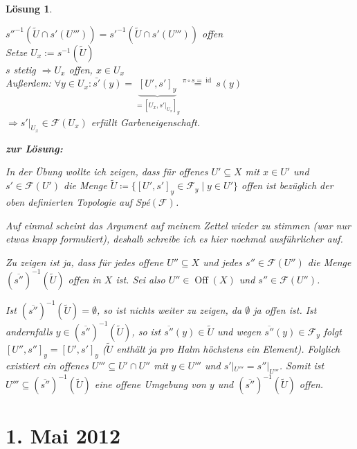 \documentclass[a4paper,12pt]{report}
\theoremstyle{break}
\newtheorem{Loes}{L\"osung}
\theoremstyle{nonumberbreak}
\theoremstyle{nonumberplain}
\newcommand{\quot}[1]{\textrm{\glqq}{#1}\textrm{\grqq}}
\newenvironment{twosidedproof}{\begin{enumerate}[\quot{$\Rightarrow$}:]}{\end{enumerate}}
\DeclareMathOperator{\Off}{Off}
\DeclareMathOperator{\id}{id}
\newcommand{\calF}{\mathcal{F}}
\begin{document}
\begin{Loes}
\begin{twosidedproof}
	$s''^{-1}(\widetilde U \cap s'(U''')) = s'^{-1}(\widetilde U \cap s'(U'''))$ offen\\
	Setze $U_x:= s^{-1}(\widetilde U)$\\
	$s$ stetig $\Rightarrow U_x$ offen, $x\in U_x$\\
	Au\ss erdem: $\forall y \in U_x: \bar{s'}(y) = \underbrace{[U', s']_y}_{=[U_x, s'|_{U_x}]_y} \overset{\pi \circ s = \id}{=} s(y)$\\
	$\Rightarrow s'|_{U_x} \in \calF(U_x)$ erf\"ullt Garbeneigenschaft.
\end{twosidedproof}

\textbf{zur Lösung:}

In der Übung wollte ich zeigen, dass für offenes $U' \subseteq X$ mit $x \in U'$ und $s' \in \mathcal{F}(U')$ die Menge $\tilde{U} \coloneqq \{ [U',s']_y \in \mathcal{F}_y \mid y \in U' \}$ offen ist bezüglich der oben definierten Topologie auf Sp\'e$(\mathcal{F})$.

Auf einmal scheint das Argument auf meinem Zettel wieder zu stimmen (war nur etwas knapp formuliert), deshalb schreibe ich es hier nochmal ausführlicher auf.

Zu zeigen ist ja, dass für jedes offene $U'' \subseteq X$ und jedes $s'' \in \mathcal{F}(U'')$ die Menge $\left(\overline{s''}\right)^{-1}\left(\tilde{U}\right)$ offen in $X$ ist. Sei also $U'' \in \Off(X)$ und $s'' \in \mathcal{F}(U'')$.

Ist $\left(\overline{s''}\right)^{-1}\left(\tilde{U}\right) = \emptyset$, so ist nichts weiter zu zeigen, da $\emptyset$ ja offen ist. Ist andernfalls $y \in \left(\overline{s''}\right)^{-1}\left(\tilde{U}\right)$, so ist $ \overline{s''}(y) \in \tilde{U}$ und wegen $\overline{s''}(y) \in \mathcal{F}_y$ folgt $[U'',s'']_y = [U',s']_y$ ($\tilde{U}$ enthält ja pro Halm höchstens ein Element). Folglich existiert ein offenes $U''' \subseteq U' \cap U''$ mit $y \in U'''$ und $s'|_{U'''} = s''|_{U'''}$. Somit ist $U''' \subseteq \left(\overline{s''}\right)^{-1}\left(\tilde{U}\right)$ eine offene Umgebung von $y$ und $\left(\overline{s''}\right)^{-1}\left(\tilde{U}\right)$ offen.

\end{Loes}

\newpage
\section{1. Mai 2012}
\setcounter{Aufg}{0}
\setcounter{Loes}{0}
\end{document}
